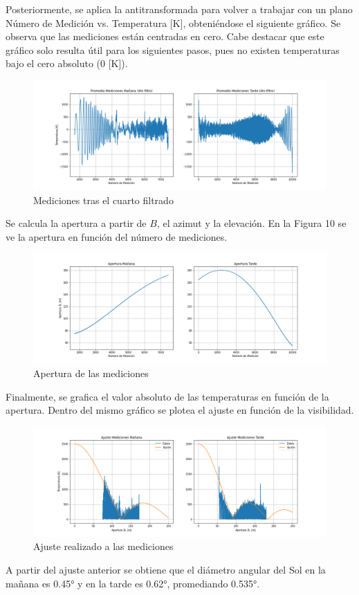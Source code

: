 Posteriormente, se aplica la antitransformada para volver a trabajar con un plano Número de Medición vs. Temperatura [K], obteniéndose el siguiente gráfico. Se observa que las mediciones están centradas en cero. Cabe destacar que este gráfico solo resulta útil para los siguientes pasos, pues no existen temperaturas bajo el cero absoluto (0 [K]).
\begin{figure}[H]
\centering
\includegraphics[scale=0.4]{img/img/inf4graf8.png}
\caption{\label{fig:Grafico} Mediciones tras el cuarto filtrado}
\end{figure}
Se calcula la apertura a partir de $B$, el azimut y la elevación. En la Figura 10 se ve la apertura en función del número de mediciones.
\begin{figure}[H]
\centering
\includegraphics[scale=0.4]{img/img/inf4graf9.png}
\caption{\label{fig:Grafico} Apertura de las mediciones}
\end{figure}
Finalmente, se grafica el valor absoluto de las temperaturas en función de la apertura. Dentro del mismo gráfico se plotea el ajuste en función de la visibilidad.
\begin{figure}[H]
\centering
\includegraphics[scale=0.4]{img/img/inf4graf10.png}
\caption{\label{fig:Grafico} Ajuste realizado a las mediciones}
\end{figure}
A partir del ajuste anterior se obtiene que el diámetro angular del Sol en la mañana es 0.45° y en la tarde es 0.62°, promediando 0.535°.
\newpage

